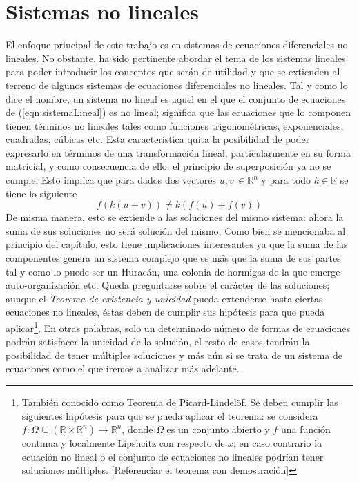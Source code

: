\section{Sistemas no lineales}
El enfoque principal de este trabajo es en sistemas de ecuaciones diferenciales no lineales. No obstante, ha sido pertinente abordar el tema de los sistemas lineales para poder introducir los conceptos que serán de utilidad y que se extienden al terreno de algunos sistemas de ecuaciones diferenciales no lineales. Tal y como lo dice el nombre, un sistema no lineal es aquel en el que el conjunto de ecuaciones de (\ref{eqn:sistemaLineal}) es no lineal; significa que las ecuaciones que lo componen tienen términos no lineales tales como funciones trigonométricas, exponenciales, cuadradas, cúbicas etc. Esta característica quita la posibilidad de poder expresarlo en términos de una transformación lineal, particularmente en su forma matricial, y como consecuencia de ello: el principio de superposición ya no se cumple. Esto implica que para dados dos vectores $u,v\, \in\mathbb{R}^n$ y para todo $k\in\mathbb{R}$ se tiene lo siguiente
$$f(k(u+v))\neq k\left (f(u)+f(v)\right )$$
De misma manera, esto se extiende a las soluciones del mismo sistema: ahora la suma de sus soluciones no será solución del mismo. Como bien se mencionaba al principio del capítulo, esto tiene implicaciones interesantes ya que la suma de las componentes genera un sistema complejo que es más que la suma de sus partes tal y como lo puede ser un Huracán, una colonia de hormigas de la que emerge auto-organización etc. Queda preguntarse sobre el carácter de las soluciones; aunque el \textit{Teorema de existencia y unicidad} pueda extenderse hasta ciertas ecuaciones no lineales, éstas deben de cumplir sus hipótesis para que pueda aplicar\footnote{También conocido como Teorema de Picard-Lindelöf. Se deben cumplir las siguientes hipótesis para que se pueda aplicar el teorema: se considera $f:\Omega\subseteq (\mathbb{R}\times\mathbb{R}^n)\to\mathbb{R}^n$, donde $\Omega$ es un conjunto abierto y $f$ una función continua y localmente Lipshcitz con respecto de $x$; en caso contrario la ecuación no lineal o el conjunto de ecuaciones no lineales podrían tener soluciones múltiples. [Referenciar el teorema con demostración]}. En otras palabras, solo un determinado número de formas de ecuaciones podrán satisfacer la unicidad de la solución, el resto de casos tendrán la posibilidad de tener múltiples soluciones y más aún si se trata de un sistema de ecuaciones como el que iremos a analizar más adelante.\\
